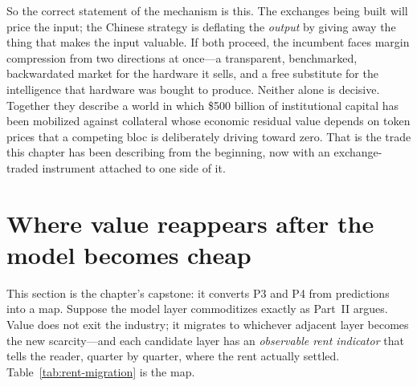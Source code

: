 So the correct statement of the mechanism is this. The exchanges being built will price the input; the Chinese strategy is deflating the \emph{output} by giving away the thing that makes the input valuable. If both proceed, the incumbent faces margin compression from two directions at once---a transparent, benchmarked, backwardated market for the hardware it sells, and a free substitute for the intelligence that hardware was bought to produce. Neither alone is decisive. Together they describe a world in which \$500 billion of institutional capital has been mobilized against collateral whose economic residual value depends on token prices that a competing bloc is deliberately driving toward zero. That is the trade this chapter has been describing from the beginning, now with an exchange-traded instrument attached to one side of it.

\section{Where value reappears after the model becomes cheap}
\label{sec:rent-migration}

This section is the chapter's capstone: it converts P3 and P4 from predictions into a map. Suppose the model layer commoditizes exactly as Part~II argues. Value does not exit the industry; it migrates to whichever adjacent layer becomes the new scarcity---and each candidate layer has an \emph{observable rent indicator} that tells the reader, quarter by quarter, where the rent actually settled. Table~\ref{tab:rent-migration} is the map.

